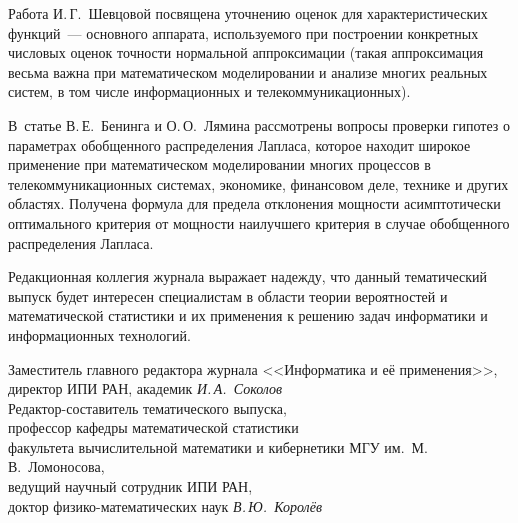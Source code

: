 {{{Работа И.\,Г.~Шевцовой посвящена уточнению оценок для 
характеристических функций~--- основного аппарата, используемого при построении конкретных числовых 
оценок точности нормальной аппроксимации (такая аппроксимация весьма важна при математическом моделировании 
и анализе многих реальных систем, в том числе  информационных и телекоммуникационных). 

В~статье В.\,Е.~Бенинга и О.\,О.~Лямина рассмотрены вопросы проверки гипотез о параметрах 
обобщенного распределения Лапласа, которое находит широкое применение при математическом 
моделировании многих процессов в телекоммуникационных системах, экономике, финансовом деле, 
технике и других областях. Получена формула для предела отклонения мощности асимптотически 
оптимального критерия от мощности наилучшего критерия в случае обобщенного распределения Лапласа. 

Редакционная коллегия журнала выражает надежду, что данный тематический  выпуск будет интересен 
специалистам в области теории вероятностей и математической статистики и их применения к решению 
задач информатики и информационных технологий.

\vspace*{15mm}
\noindent
Заместитель главного редактора журнала <<Информатика и её применения>>,\\
директор ИПИ РАН, академик  \hfill
\textit{И.\,А.~Соколов}\\[-6pt]

\noindent
Редактор-составитель тематического выпуска,\\
профессор кафедры математической статистики\\
факультета вычислительной математики и кибернетики МГУ им.~М.\,В.~Ломоносова,\\
ведущий научный сотрудник ИПИ РАН,\\
доктор физико-математических наук\hfill
 \textit{В.\,Ю.~Королёв}


} }
}